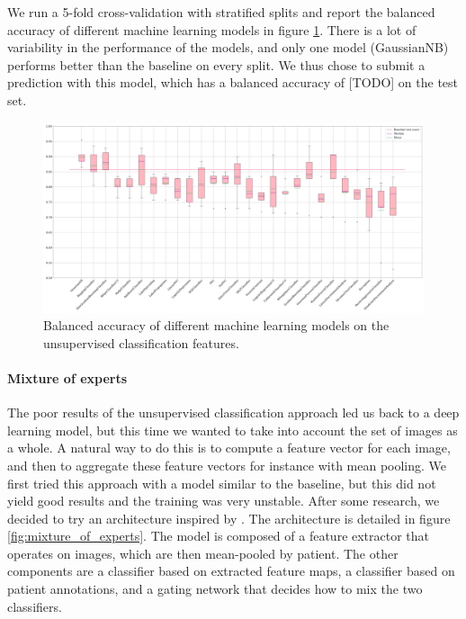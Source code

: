 \documentclass{midl}
\begin{document}
We run a 5-fold cross-validation with stratified splits and report the balanced accuracy of different machine learning models in figure \ref{fig:unsupervised_classification_models}. There is a lot of variability in the performance of the models, and only one model (GaussianNB) performs better than the baseline on every split. We thus chose to submit a prediction with this model, which has a balanced accuracy of [TODO] on the test set.

\begin{figure}[h]
    \centering
    \includegraphics[width=\textwidth]{figures/unsupervised_classification_models.png}
    \caption{Balanced accuracy of different machine learning models on the unsupervised classification features.}
    \label{fig:unsupervised_classification_models}
\end{figure}

\paragraph*{Mixture of experts}
The poor results of the unsupervised classification approach led us back to a deep learning model, but this time we wanted to take into account the set of images as a whole. A natural way to do this is to compute a feature vector for each image, and then to aggregate these feature vectors for instance with mean pooling. We first tried this approach with a model similar to the baseline, but this did not yield good results and the training was very unstable. After some research, we decided to try an architecture inspired by \cite{Sahasrabudhe_2021}. The architecture is detailed in figure \ref{fig:mixture_of_experts}. The model is composed of a feature extractor that operates on images, which are then mean-pooled by patient. The other components are a classifier based on extracted feature maps, a classifier based on patient annotations, and a gating network that decides how to mix the two classifiers.
\end{document}
